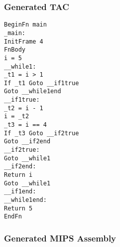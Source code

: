 \subsubsection{Generated TAC}
\begin{lstlisting}[showstringspaces=false,breaklines=true,backgroundcolor=\color{light-gray}, captionpos=b]
BeginFn main
_main:
InitFrame 4
FnBody
i = 5
__while1:
_t1 = i > 1
If _t1 Goto __if1true
Goto __while1end
__if1true:
_t2 = i - 1
i = _t2
_t3 = i == 4
If _t3 Goto __if2true
Goto __if2end
__if2true:
Goto __while1
__if2end:
Return i
Goto __while1
__if1end:
__while1end:
Return 5
EndFn

\end{lstlisting}\subsubsection{Generated MIPS Assembly}
